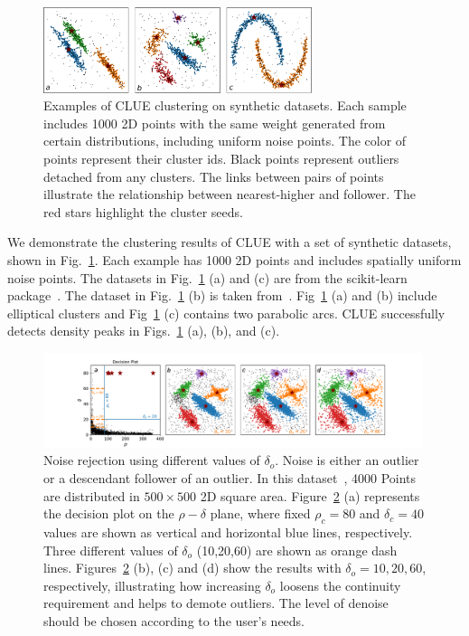 \begin{figure}[ht]
    \centering
    \includegraphics[clip, width=0.7\textwidth]{chapters/HGCal/figures/clue/Figure3_cut_boh.pdf}
    \caption{ 
    Examples of CLUE clustering on synthetic datasets. Each sample includes 1000 2D points with the same weight generated from certain distributions, including uniform noise points. The color of points represent their cluster ids. Black points represent outliers detached from any clusters. The links between pairs of points illustrate the relationship between nearest-higher and follower. The red stars highlight the cluster seeds.
    }
    \label{fig:performance:example}
\end{figure}

We demonstrate the clustering results of CLUE with a set of synthetic datasets, shown in Fig.~\ref{fig:performance:example}. Each example has 1000 2D points and includes spatially uniform noise points. The datasets in Fig.~\ref{fig:performance:example} (a) and (c)  are from the scikit-learn package~\cite{scikit-learn}. The dataset in Fig.~\ref{fig:performance:example} (b) is taken from~\cite{rodriguez2014clustering}. Fig~\ref{fig:performance:example} (a) and (b) include elliptical clusters and Fig~\ref{fig:performance:example} (c) contains two parabolic arcs. CLUE successfully detects
density peaks in Figs.~\ref{fig:performance:example} (a), (b), and (c).

\begin{figure}[ht]
    \centering
    \includegraphics[trim=3.5cm 0cm 3.5cm 0cm, clip,width=0.99\textwidth]{chapters/HGCal/figures/clue/Figure4.pdf}
    \caption{ Noise rejection using different values of $\delta_o$. Noise is either an outlier or a descendant follower of an outlier. In this dataset~\cite{rodriguez2014clustering}, 4000 Points are distributed in $500\times500$ 2D square area. Figure~\ref{fig:performance:outlierCuts} (a) represents the decision plot on the $\rho-\delta$ plane, where fixed $\rho_c=80$ and $\delta_c=40$ values are shown as vertical and horizontal blue lines, respectively. Three different values of $\delta_o$ (10,20,60) are shown as orange dash lines. Figures~\ref{fig:performance:outlierCuts} (b), (c) and (d) show the results with $\delta_o=10,20,60$, respectively, illustrating how increasing $\delta_o$ loosens the continuity requirement and helps to demote outliers. The level of denoise should be chosen according to the user's needs.}
    \label{fig:performance:outlierCuts}
\end{figure}

